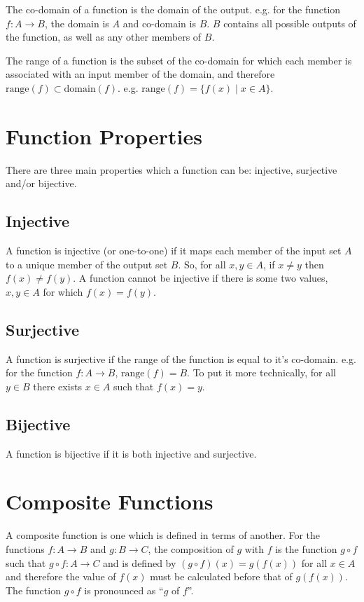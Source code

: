 The co-domain of a function is the domain of the output. e.g. for the function $f : A \rightarrow B$, the domain is $A$
 and co-domain is $B$. $B$ contains all possible outputs of the function, as well as any other members of $B$.

The range of a function is the subset of the co-domain for which each member is associated with an input member of the
 domain, and therefore $\mathrm{range}(f) \subset \mathrm{domain}(f)$. e.g. $\mathrm{range}(f) = \{f(x) \mid x \in A\}$.

\section*{Function Properties}

There are three main properties which a function can be: injective, surjective and/or bijective.

\subsection*{Injective}

A function is injective (or one-to-one) if it maps each member of the input set $A$ to a unique member of the output set
 $B$. So, for all $x, y \in A$, if $x \neq y$ then $f(x) \neq f(y)$. A function cannot be injective if there is some two 
 values, $x, y \in A$ for which $f(x) = f(y)$.

\subsection*{Surjective}

A function is surjective if the range of the function is equal to it's co-domain. e.g. for the function
 $f : A \rightarrow B$, $\mathrm{range}(f) = B$. To put it more technically, for all $y \in B$ there exists $x \in A$
 such that $f(x) = y$.

\subsection*{Bijective}

A function is bijective if it is both injective and surjective.

\section*{Composite Functions}

A composite function is one which is defined in terms of another. For the functions $f : A \rightarrow B$ and
 $g : B \rightarrow C$, the composition of $g$ with $f$ is the function $g \circ f$ such that
 $g \circ f : A \rightarrow C$ and is defined by $(g \circ f)(x) = g(f(x))$ for all $x \in A$ and therefore the value of
 $f(x)$ must be calculated before that of $g(f(x))$. The function $g \circ f$ is pronounced as ``$g$ of $f$''.

